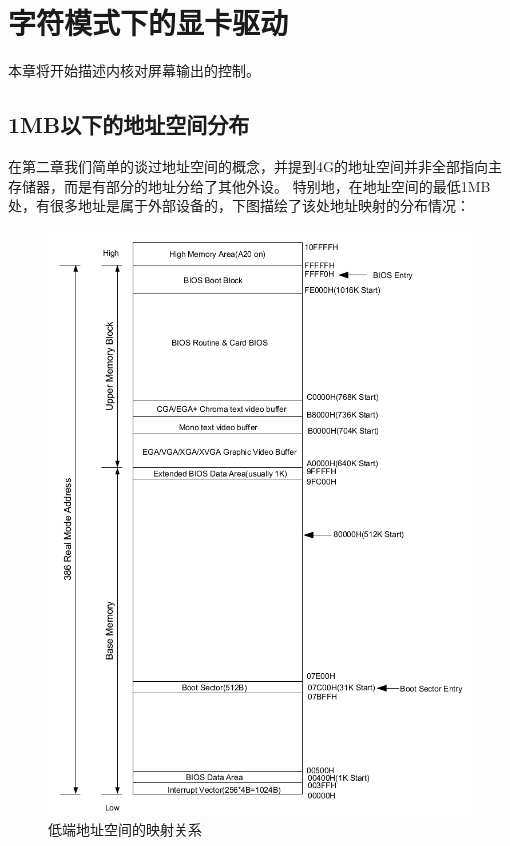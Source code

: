 
\section {字符模式下的显卡驱动}

\par 本章将开始描述内核对屏幕输出的控制。

\subsection{1MB以下的地址空间分布}

\par 在第二章我们简单的谈过地址空间的概念，并提到4G的地址空间并非全部指向主存储器，而是有部分的地址分给了其他外设。\allowbreak
特别地，在地址空间的最低1MB处，有很多地址是属于外部设备的，下图描绘了该处地址映射的分布情况：

\begin{figure}[ht]
      \centering
      \includegraphics[scale=0.65]{picture/chapt4/BIOS-mem.png}
      \caption{低端地址空间的映射关系}
\end{figure}

